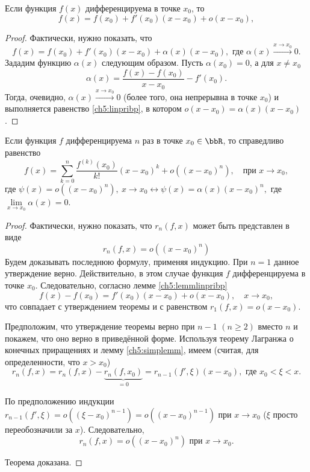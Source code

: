 \begin{lemm}\label{ch5:lemmlinpribp}
Если функция $f(x)$ дифференцируема в точке $x_0$, то
\begin{equation}\label{ch5:linpribp}
f(x) = f(x_0) + f'(x_0) (x-x_0) + o(x-x_0),
\end{equation}
\end{lemm}
\begin{proof}
Фактически, нужно показать, что
\begin{equation}\label{ch5:linpribp2}
f(x) = f(x_0) + f'(x_0) (x-x_0) + \alpha(x)(x-x_0), \text{ где } \alpha(x)\xrightarrow{x\to x_0} 0.
\end{equation}	
Зададим функцию $\alpha(x)$ следующим образом. Пусть $\alpha(x_0) = 0$, а для $x\ne x_0$ 
$$
\alpha(x) = \frac{f(x) - f(x_0)}{x-x_0} - f'(x_0). 
$$
Тогда, очевидно, $\alpha(x)\xrightarrow{x\to x_0} 0$ (более того, она непрерывна в точке $x_0$) и выполняется равенство \eqref{ch5:linpribp}, в котором $o(x-x_0) = \alpha(x)(x-x_0)$.
\end{proof}
\begin{thm}
Если функция $f$ дифференцируема $n$ раз в точке $x_0 \in \bbR$, то справедливо равенство
\begin{equation} \label{ch5.2eq2}
f(x) = \sum_{k = 0}^{n} \frac{f^{(k)}(x_0)}{k!} (x - x_0)^k + o((x - x_0)^n), \quad \text{при } x \to x_0,
\end{equation}
где $\psi(x) = o((x - x_0)^n),\ x \to x_0 \leftrightarrow \psi(x) = \alpha(x) (x - x_0)^n,$ где $\lim\limits_{x \to x_0} \alpha(x) = 0$.
\end{thm}
\begin{proof}
Фактически, нужно показать, что $r_n(f,x)$ может быть представлен в виде
$$
r_n(f,x) = o((x-x_0)^n)
$$
Будем доказывать последнюю формулу, применяя индукцию. При $n=1$ данное утверждение верно. Действительно, в этом случае функция $f$ дифференцируема в точке $x_0$. Следовательно, согласно лемме \ref{ch5:lemmlinpribp}
$$
f(x) - f(x_0) = f'(x_0) (x-x_0) + o(x-x_0),\quad x\to x_0,
$$
что совпадает с утверждением теоремы и с равенством $r_1(f,x)=o(x-x_0)$.

Предположим, что утверждение теоремы верно при $n-1$ $(n\ge 2)$ вместо $n$ и покажем, что оно верно в приведённой форме. Используя теорему Лагранжа о конечных приращениях и лемму \ref{ch5:simplemm}, имеем (считая, для определенности, что $x > x_0$)
$$
r_n(f,x) = r_n(f,x) - \underbrace{r_n(f,x_0)}_{=0} = r_{n-1} (f',\xi) (x-x_0), \text{ где } x_0<\xi<x.
$$

По предположению индукции $r_{n-1}(f', \xi) = o((\xi-x_0)^{n-1}) = o((x-x_0)^{n-1})$ при $x\to x_0$ ($\xi$ просто переобозначили за $x$). Следовательно, 
$$
r_n(f,x) = o((x-x_0)^n) \text{ при } x\to x_0.
$$

Теорема доказана.
\end{proof}

